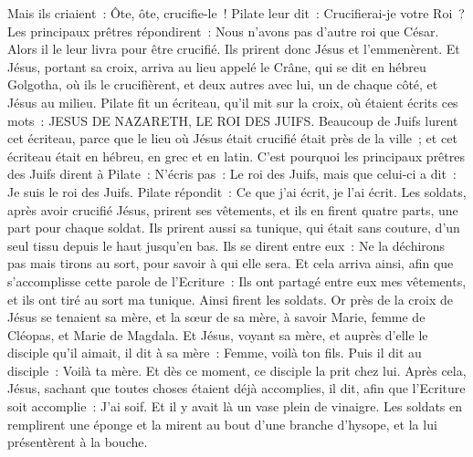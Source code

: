 \begin{multicols}{2}
Mais ils criaient~: Ôte, ôte, crucifie-le~! Pilate leur dit~: Crucifierai-je votre Roi~? Les principaux prêtres répondirent~: Nous n'avons pas d'autre roi que César.
Alors il le leur livra pour être crucifié. Ils prirent donc Jésus et l'emmenèrent.
Et Jésus, portant sa croix, arriva au lieu appelé le Crâne, qui se dit en hébreu Golgotha,
où ils le crucifièrent, et deux autres avec lui, un de chaque côté, et Jésus au milieu.
Pilate fit un écriteau, qu'il mit sur la croix, où étaient écrits ces mots~: JESUS DE NAZARETH, LE ROI DES JUIFS.
Beaucoup de Juifs lurent cet écriteau, parce que le lieu où Jésus était crucifié était près de la ville~; et cet écriteau était en hébreu, en grec et en latin.
C'est pourquoi les principaux prêtres des Juifs dirent à Pilate~: N'écris pas~: Le roi des Juifs, mais que celui-ci a dit~: Je suis le roi des Juifs.
Pilate répondit~: Ce que j'ai écrit, je l'ai écrit.
Les soldats, après avoir crucifié Jésus, prirent ses vêtements, et ils en firent quatre parts, une part pour chaque soldat. Ils prirent aussi sa tunique, qui était sans couture, d'un seul tissu depuis le haut jusqu'en bas.
Ils se dirent entre eux~: Ne la déchirons pas mais tirons au sort, pour savoir à qui elle sera. Et cela arriva ainsi, afin que s'accomplisse cette parole de l'Ecriture~: Ils ont partagé entre eux mes vêtements, et ils ont tiré au sort ma tunique. Ainsi firent les soldats.
Or près de la croix de Jésus se tenaient sa mère, et la sœur de sa mère, à savoir Marie, femme de Cléopas, et Marie de Magdala.
Et Jésus, voyant sa mère, et auprès d'elle le disciple qu'il aimait, il dit à sa mère~: Femme, voilà ton fils.
Puis il dit au disciple~: Voilà ta mère. Et dès ce moment, ce disciple la prit chez lui.
Après cela, Jésus, sachant que toutes choses étaient déjà accomplies, il dit, afin que l'Ecriture soit accomplie~: J'ai soif.
Et il y avait là un vase plein de vinaigre. Les soldats en remplirent une éponge et la mirent au bout d'une branche d'hysope, et la lui présentèrent à la bouche.

\end{multicols}
